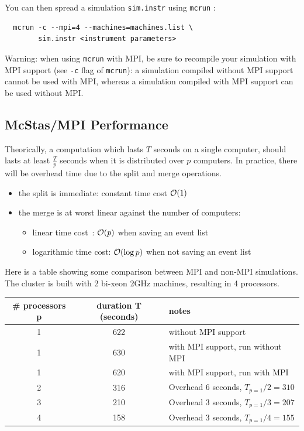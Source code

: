 You can then spread a simulation \verb'sim.instr' using \verb'mcrun' :
\begin{verbatim}
  mcrun -c --mpi=4 --machines=machines.list \
        sim.instr <instrument parameters>
\end{verbatim}

\begin{paragraph}{Warning:} when using \verb'mcrun' with MPI, be sure
  to recompile your simulation with MPI support (see \verb'-c' flag of
  \verb'mcrun'): a simulation compiled without MPI support cannot be
  used with MPI, whereas a simulation compiled with MPI support can be
  used without MPI.
\end{paragraph}

\subsection{McStas/MPI Performance}

Theorically, a computation which lasts $T$ seconds on a single computer,
should lasts at least $\frac{T}{p}$ seconds when it is distributed
over $p$ computers. In practice, there will be overhead time due to the split
and merge operations.
\begin{itemize}
\item the split is immediate: constant time cost ${\cal O}(1)$
\item the merge is at worst linear against the number of computers:
  \begin{itemize}
  \item linear time cost~: ${\cal O}(p)$ when saving an event list
  \item logarithmic time cost: ${\cal O}(\log{p})$ when not saving an
  event list
  \end{itemize}
\end{itemize}

Here is a table showing some comparison between MPI and non-MPI
simulations. The cluster is built with 2 bi-xeon 2GHz machines,
resulting in 4 processors.
\begin{center}
  \begin{tabular}{|c|c|l|}
    \hline
    \# processors p & duration T (seconds)& notes \\
    \hline
    1 & 622 & without MPI support \\
    1 & 630 & with MPI support, run without MPI \\
    1 & 620 & with MPI support, run with MPI \\
    \hline
    2 & 316 & Overhead 6 seconds, $T_{p=1}/2 = 310$\\
    3 & 210 & Overhead 3 seconds, $T_{p=1}/3 = 207$\\
    4 & 158 & Overhead 3 seconds, $T_{p=1}/4 = 155$\\
    \hline
  \end{tabular}
\end{center}

